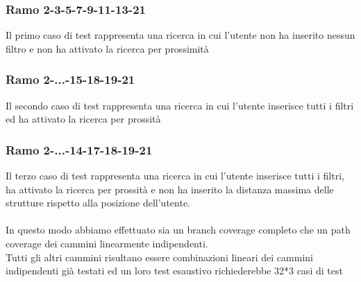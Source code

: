

\subsubsection{Ramo 2-3-5-7-9-11-13-21}
Il primo caso di test rappresenta una ricerca in cui l'utente non ha inserito nessun filtro e non ha attivato la ricerca per prossimità

\subsubsection{Ramo 2-...-15-18-19-21}
Il secondo caso di test rappresenta una ricerca in cui l'utente inserisce tutti i filtri ed ha attivato la ricerca per prossità

\subsubsection{Ramo 2-...-14-17-18-19-21}
Il terzo caso di test rappresenta una ricerca in cui l'utente inserisce tutti i filtri, ha attivato la ricerca per prossità e non ha inserito la distanza massima delle strutture rispetto alla posizione dell'utente.\\
\\
In questo modo abbiamo effettuato sia un branch coverage completo che un path coverage dei cammini linearmente indipendenti.\\ Tutti gli altri cammini risultano essere combinazioni lineari
dei cammini indipendenti già testati ed un loro test esaustivo richiederebbe 32*3 casi di test